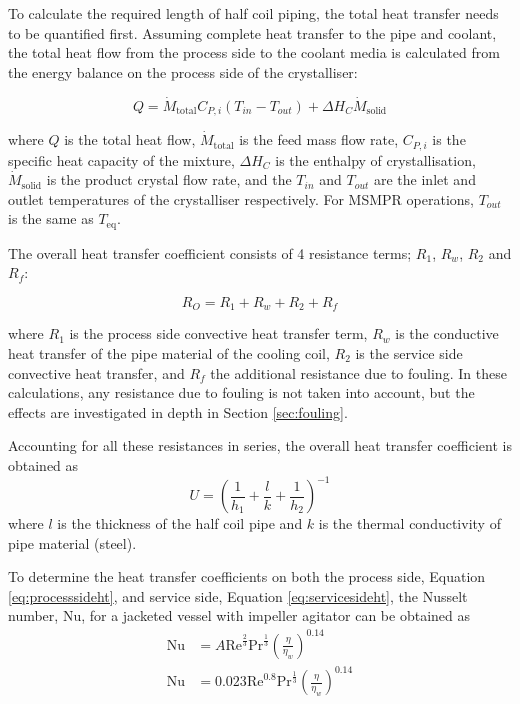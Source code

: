 To calculate the required length of half coil piping, the total heat transfer needs to be quantified first. Assuming complete heat transfer to the pipe and coolant, the total heat flow from the process side to the coolant media is calculated from the energy balance on the process side of the crystalliser:

\begin{equation} \label{eq:energy balance}
    Q =  \dot{M}_{\mathrm{total}} C_{P,i} (T_{in}-T_{out}) + \Delta H_{C} \dot{M}_{\mathrm{solid}}
\end{equation}

\noindent where $Q$ is the total heat flow, $\dot{M}_{\mathrm{total}}$ is the feed mass flow rate, $C_{P,i}$ is the specific heat capacity of the mixture, $\Delta H_{C}$ is the enthalpy of crystallisation, $\dot{M}_{\mathrm{solid}}$ is the product crystal flow rate, and the $T_{in}$ and $T_{out}$ are the inlet and outlet temperatures of the crystalliser respectively. For MSMPR operations, $T_{out}$ is the same as $T_{\mathrm{eq}}$. 


The overall heat transfer coefficient consists of 4 resistance terms; $R_1$, $R_w$, $R_2$ and $R_f$:

\begin{equation} \label{eq:resistht}
    R_O = R_1 + R_w + R_2 + R_f
\end{equation}

\noindent where $R_1$ is the process side convective heat transfer term, $R_w$ is the conductive heat transfer of the pipe material of the cooling coil, $R_2$ is the service side convective heat transfer, and $R_f$ the additional resistance due to fouling. In these calculations, any resistance due to fouling is not taken into account, but the effects are investigated in depth in Section \ref{sec:fouling}. 

Accounting for all these resistances in series, the overall heat transfer coefficient is obtained as 
\begin{equation} \label{eq:energy balance}
    U = \left(\frac{1}{h_1} + \frac{l}{k}   + \frac{1}{h_2 } \right)^{-1}
\end{equation}
where $l$ is the thickness of the half coil pipe and $k$ is the thermal conductivity of pipe material (steel).

To determine the heat transfer coefficients on both the process side, Equation \ref{eq:processsideht}, and service side, Equation \ref{eq:servicesideht}, the Nusselt number, $\mathrm{Nu}$, for a jacketed vessel with impeller agitator can be obtained as \cite{carpenter_agitated_2011}
\begin{align} 
    \mathrm{Nu} &= A\mathrm{Re}^{\frac{2}{3}}\mathrm{Pr}^{\frac{1}{3}}\left( \frac{\eta}{\eta_w} \right)^{0.14} \label{eq:processsideht} \\
    \mathrm{Nu} &= 0.023\mathrm{Re}^{0.8}\mathrm{Pr}^{\frac{1}{3}} \left( \frac{\eta}{\eta_w} \right)^{0.14} \label{eq:servicesideht}
\end{align}


